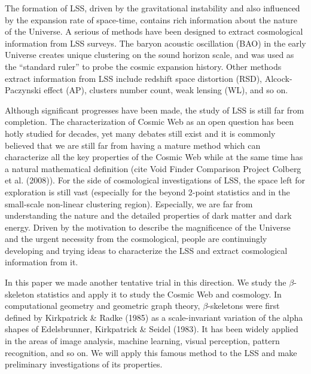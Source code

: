 \documentclass[useAMS,usenatbib]{mnras}
\begin{document}
The formation of LSS, driven by the gravitational instability and also influenced by the expansion rate of space-time, 
contains rich information about the nature of the Universe. 
A serious of methods have been designed to extract cosmological information from LSS surveys. 
The baryon acoustic oscillation (BAO) in the early Universe creates unique clustering on the sound horizon scale,
and was used as the ``standard ruler'' to probe the cosmic expansion history. 
Other methods extract information from LSS include redshift space distortion (RSD), Alcock-Paczynski effect (AP), clusters number count, weak lensing (WL), and so on.

Although significant progresses have been made, 
the study of LSS is still far from completion. 
The characterization of Cosmic Web as an open question has been hotly studied for decades, 
yet many debates still exist and it is commonly believed that we are still far from having a mature method 
which can characterize all the key properties of the Cosmic Web while at the same time has a natural mathematical definition 
(cite Void Finder Comparison Project Colberg et al. (2008)). 
For the side of cosmological investigations of LSS, 
the space left for exploration is still vast 
(especially for the beyond 2-point statistics and in the small-scale non-linear clustering region). 
Especially, we are far from understanding the nature and the detailed properties of dark matter and dark energy. 
Driven by the motivation to describe the magnificence of the Universe and the urgent necessity from the cosmological, 
people are continuingly developing and trying ideas to characterize the LSS and extract cosmological information from it.
 
In this paper we made another tentative trial in this direction. 
We study the $\beta$-skeleton statistics and apply it to study the Cosmic Web and cosmology. 
In computational geometry and geometric graph theory, $\beta$-skeletons were first defined by Kirkpatrick \& Radke (1985) 
as a scale-invariant variation of the alpha shapes of Edelsbrunner, Kirkpatrick \& Seidel (1983). 
It has been widely applied in the areas of image analysis, machine learning, visual perception, pattern recognition, and so on. 
We will apply this famous method to the LSS and make preliminary investigations of its properties.


\end{document}
